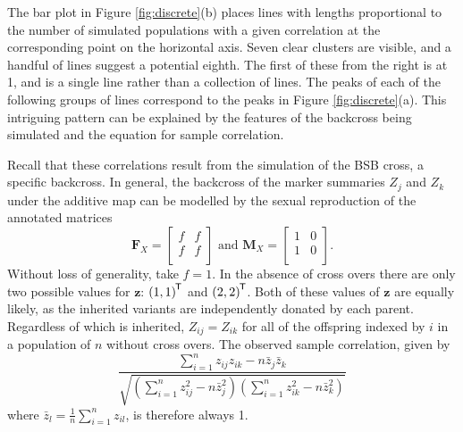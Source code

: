 \documentclass[sts]{imsart}
\newcommand{\ve}[1]{\mathbf{#1}}           %
\newcommand{\m}[1]{\mathbf{#1}}               %
\newcommand{\tr}[1]{{#1}^{\mkern-1.5mu\mathsf{T}}}              %
\begin{document}
The bar plot in Figure \ref{fig:discrete}(b) places lines with lengths proportional to the number of simulated populations with a given correlation at the corresponding point on the horizontal axis. Seven clear clusters are visible, and a handful of lines suggest a potential eighth. The first of these from the right is at 1, and is a single line rather than a collection of lines. The peaks of each of the following groups of lines correspond to the peaks in Figure \ref{fig:discrete}(a). This intriguing pattern can be explained by the features of the backcross being simulated and the equation for sample correlation.

Recall that these correlations result from the simulation of the BSB cross, a specific backcross. In general, the backcross of the marker summaries $Z_j$ and $Z_k$ under the additive map can be modelled by the sexual reproduction of the annotated matrices
$$\m{F}_X = \begin{bmatrix}
  f & f \\
  f & f \\
\end{bmatrix} \text{ and }
\m{M}_X = \begin{bmatrix}
  1 & 0 \\
  1 & 0 \\
\end{bmatrix}.$$
Without loss of generality, take $f = 1$. In the absence of cross overs there are only two possible values for $\ve{z}$: $\tr{(1,1)}$ and $\tr{(2,2)}$. Both of these values of $\ve{z}$ are equally likely, as the inherited variants are independently donated by each parent. Regardless of which is inherited, $Z_{ij} = Z_{ik}$ for all of the offspring indexed by $i$ in a population of $n$ without cross overs. The observed sample correlation, given by
\begin{equation} \label{eq:sampleCorr}
\frac{\sum_{i = 1}^n z_{ij} z_{ik} - n \bar{z}_{j} \bar{z}_{k}}{\sqrt{ \left ( \sum_{i = 1}^n z_{ij}^2 - n \bar{z}_{j}^2 \right ) \left ( \sum_{i = 1}^n z_{ik}^2 - n \bar{z}_{k}^2 \right )}}
\end{equation}
where $\bar{z}_l = \frac{1}{n} \sum_{i = 1}^n z_{il}$, is therefore always 1.
\end{document}
